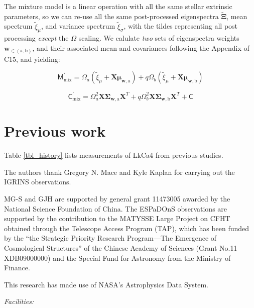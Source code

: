 \documentclass[twocolumn]{emulateapj}%
\newcommand{\iancze}{{\sc C15}}
\begin{document}
The mixture model is a linear operation with all the same stellar extrinsic parameters, so we can re-use all the same post-processed eigenspectra $\widetilde{\mathbf{\Xi}}$, mean spectrum $\widetilde{\xi}_\mu$, and variance spectrum $\widetilde{\xi}_\sigma$, with the tildes representing all post processing \emph{except} the $\Omega$ scaling.  We calulate \emph{two} sets of eigenspectra weights $\mathbf{w}_{\in (\mathrm{a}, \mathrm{b})}$, and their associated mean and covariances following the Appendix of \iancze, and yielding:

\begin{equation}
  \mathsf{M}_{\mathrm{mix}}^\prime = \Omega_a (\widetilde{\xi}_\mu + \mathbf{X} \mathbf{\mu}_{\mathbf{w}, \mathrm{a}}) + q \Omega_b (\widetilde{\xi}_\mu + \mathbf{X} \mathbf{\mu}_{\mathbf{w}, \mathrm{b}})
\end{equation}

\begin{equation}
  \mathsf{C}_{\mathrm{mix}}^\prime = \Omega_a^2 \mathbf{X} \mathbf{\Sigma}_\mathbf{w, \mathrm{a}} \mathbf{X}^T + q \Omega_b^2 \mathbf{X} \mathbf{\Sigma}_\mathbf{w, \mathrm{b}} \mathbf{X}^T + \mathsf{C}
  \label{eqn:modC}
\end{equation}



\section{Previous work}

Table \ref{tbl_history} lists measurements of LkCa4 from previous studies.



\acknowledgements
The authors thank Gregory N. Mace and Kyle Kaplan for carrying out the IGRINS observations. 

MG-S and GJH are supported by general grant 11473005 awarded by the National
Science Foundation of China.   The ESPaDOnS observations are supported by the contribution to the MATYSSE Large Project on CFHT obtained  through the Telescope Access Program (TAP), which has been funded by the ``the Strategic Priority Research Program---The Emergence of Cosmological Structures'' of the Chinese Academy of Sciences (Grant No.11 XDB09000000) and the Special Fund for Astronomy from the Ministry of Finance. 

This research has made use of NASA's Astrophysics Data System.

{\it Facilities:} 

\clearpage



\end{document}
